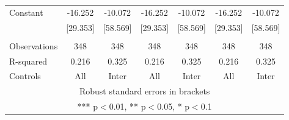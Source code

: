 \begin{tabular}{lcccccc}
Constant & -16.252 & -10.072 & -16.252 & -10.072 & -16.252 & -10.072 \\
 & [29.353] & [58.569] & [29.353] & [58.569] & [29.353] & [58.569] \\
 &  &  &  &  &  &  \\
Observations & 348 & 348 & 348 & 348 & 348 & 348 \\
R-squared & 0.216 & 0.325 & 0.216 & 0.325 & 0.216 & 0.325 \\
 Controls & All & Inter & All & Inter & All & Inter \\ \hline
\multicolumn{7}{c}{ Robust standard errors in brackets} \\
\multicolumn{7}{c}{ *** p$<$0.01, ** p$<$0.05, * p$<$0.1} \\
\end{tabular}

